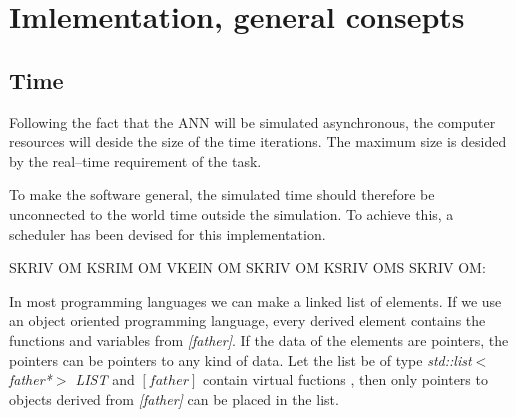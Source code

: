 \section{Imlementation, general consepts}






	





	\subsection{Time}
	\label{ssecTime}
Following the fact that the ANN will be simulated asynchronous, the computer resources will deside the size of the time iterations. The maximum size is desided by the real--time requirement of the task.

To make the software general, the simulated time should therefore be unconnected to the world time outside the simulation. To achieve this, a scheduler has been devised for this implementation.

SKRIV OM KSRIM OM VKEIN OM SKRIV OM KSRIV OMS SKRIV OM:

In most programming languages we can make a linked list of elements. %
If we use an object oriented programming language, every derived element contains the functions and variables from \emph{[father]}. 
If the data of the elements are pointers, the pointers can be pointers to any kind of data.  %
Let the list be of type \emph{std::list$<$father*$>$ LIST} and \emph{$[father]$} contain virtual fuctions %
, then only pointers to objects derived from \emph{[father]} can be placed in the list. 

